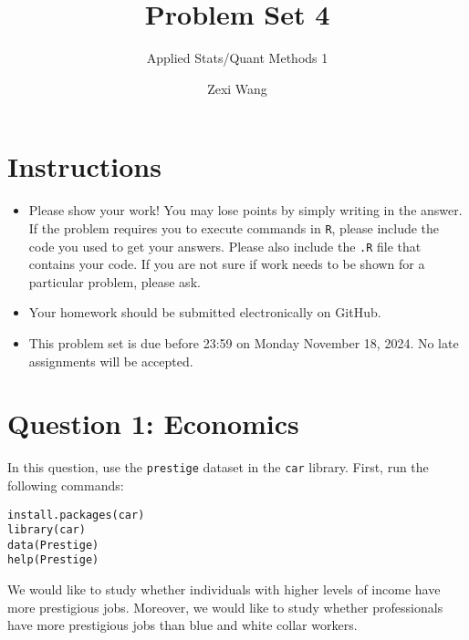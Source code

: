 \documentclass[12pt,letterpaper]{article}
\title{Problem Set 4}
\date{Zexi Wang}
\author{Applied Stats/Quant Methods 1}
\begin{document}
	\maketitle
	\section*{Instructions}
	\begin{itemize}
		\item Please show your work! You may lose points by simply writing in the answer. If the problem requires you to execute commands in \texttt{R}, please include the code you used to get your answers. Please also include the \texttt{.R} file that contains your code. If you are not sure if work needs to be shown for a particular problem, please ask.
		\item Your homework should be submitted electronically on GitHub.
		\item This problem set is due before 23:59 on Monday November 18, 2024. No late assignments will be accepted.
	\end{itemize}



	\vspace{.5cm}
\section*{Question 1: Economics}
\vspace{.25cm}
\noindent 	
In this question, use the \texttt{prestige} dataset in the \texttt{car} library. First, run the following commands:

\begin{verbatim}
install.packages(car)
library(car)
data(Prestige)
help(Prestige)
\end{verbatim} 


\noindent We would like to study whether individuals with higher levels of income have more prestigious jobs. Moreover, we would like to study whether professionals have more prestigious jobs than blue and white collar workers.
\end{document}
